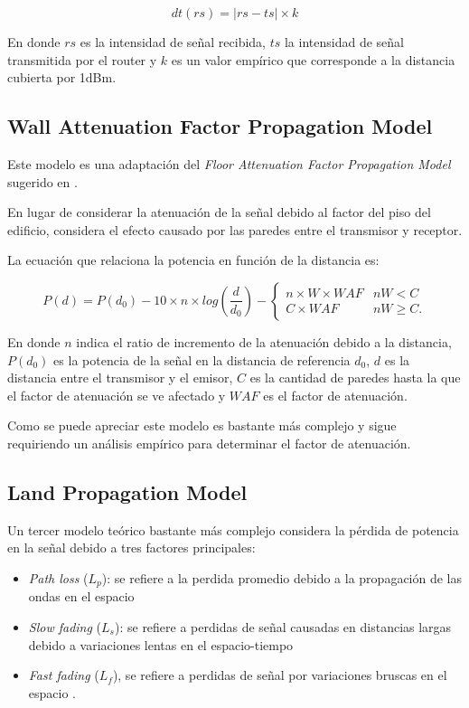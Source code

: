 \documentclass[journal]{IEEEtran}
\begin{document}
$$dt(rs) = |rs - ts| \times k$$

En donde $rs$ es la intensidad de señal recibida, $ts$ la intensidad de señal transmitida por el router y $k$ es un valor empírico que corresponde a la distancia cubierta por 1dBm.\\

\subsection{Wall Attenuation Factor Propagation Model}

Este modelo es una adaptación del \emph{Floor Attenuation Factor Propagation Model} sugerido en \cite{path:loss:prediction:models}.

En lugar de considerar la atenuación de la señal debido al factor del piso del edificio, considera el efecto causado por las paredes entre el transmisor y receptor.

La ecuación que relaciona la potencia en función de la distancia es:

\begin{equation*}
P(d) = P(d_0) - 10 \times n \times log(\frac {d} {d_0}) - \begin{cases}
n \times W \times WAF &nW < C\\
C \times WAF &nW \geq C.
\end{cases}
\end{equation*}

En donde $n$ indica el ratio de incremento de la atenuación debido a la distancia, $P(d_0)$ es la potencia de la señal en la distancia de referencia $d_0$, $d$ es la distancia entre el transmisor y el emisor, $C$ es la cantidad de paredes hasta la que el factor de atenuación se ve afectado y $WAF$ es el factor de atenuación.

Como se puede apreciar este modelo es bastante más complejo y sigue requiriendo un análisis empírico para determinar el factor de atenuación.

\subsection{Land Propagation Model}

Un tercer modelo teórico bastante más complejo considera la pérdida de potencia en la señal debido a tres factores principales:

\begin{itemize}

\item \emph{Path loss} ($L_p$): se refiere a la perdida promedio debido a la propagación de las ondas en el espacio

\item \emph{Slow fading} ($L_s$): se refiere a perdidas de señal causadas en distancias largas debido a variaciones lentas en el espacio-tiempo \cite{introduction:wireless:mobile:systems}

\item \emph{Fast fading} ($L_f$), se refiere a perdidas de señal por variaciones bruscas en el espacio \cite{survey:propagation:models} \cite{wireless:communications}.

\end{itemize}
\end{document}
